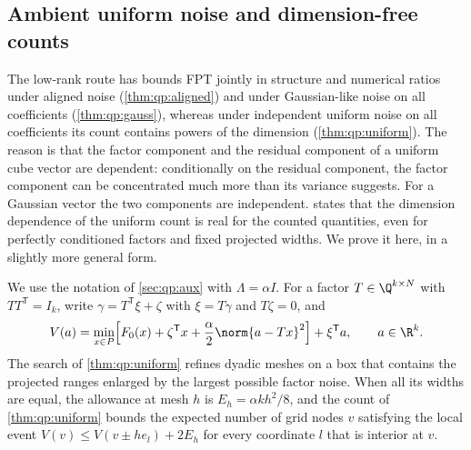 \subsection{Ambient uniform noise and dimension-free counts}\label{sec:lim:ambient}

The low-rank route has bounds FPT jointly in structure and numerical ratios under aligned noise
(\cref{thm:qp:aligned}) and under Gaussian-like noise on all coefficients
(\cref{thm:qp:gauss}), whereas under independent uniform noise on all
coefficients its count contains powers of the dimension
(\cref{thm:qp:uniform}). The reason is that the factor component and the
residual component of a uniform cube vector are dependent: conditionally on
the residual component, the factor component can be concentrated much more
than its variance suggests. For a Gaussian vector the two components are
independent.  states that the dimension
dependence of the uniform count is real for the counted quantities, even for
perfectly conditioned factors and fixed projected widths. We prove it here,
in a slightly more general form.

We use the notation of \cref{sec:qp:aux} with $\Lambda=\alpha I$. For a
factor $T\in\Q^{k\times N}$ with $TT^{\mathsf T}=I_k$, write
$\gamma=T^{\mathsf T}\xi+\zeta$ with $\xi=T\gamma$ and $T\zeta=0$, and
\begin{equation}\label{eq:lim:aux}
 V(a)=\min_{x\in P}\Bigl[F_0(x)+\zeta^{\mathsf T}x
 +\frac\alpha2\norm{a-Tx}^2\Bigr]+\xi^{\mathsf T}a,\qquad a\in\R^k .
\end{equation}
The search of \cref{thm:qp:uniform} refines dyadic meshes on a box that
contains the projected ranges enlarged by the largest possible factor
noise. When all its widths are equal, the allowance at mesh $h$ is
$E_h=\alpha kh^2/8$, and the count of \cref{thm:qp:uniform} bounds the
expected number of grid nodes $v$ satisfying the local event
$V(v)\le V(v\pm he_l)+2E_h$ for every coordinate $l$ that is interior at
$v$.

